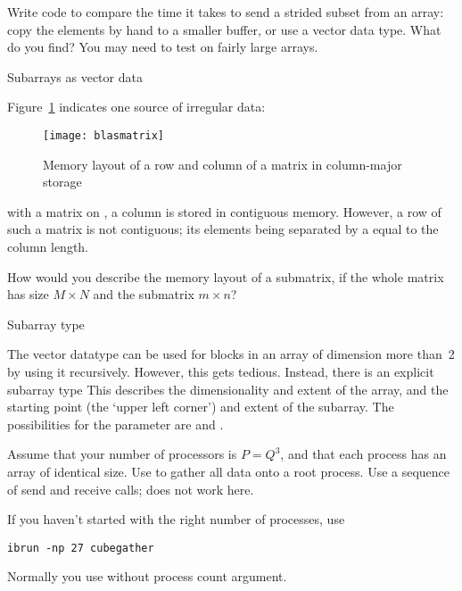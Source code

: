 \begin{exercise}
  Write code to compare the time it takes to send a strided subset
  from an array: copy the elements by hand to a smaller buffer, or use
  a vector data type. What do you find? You may need to test on fairly
  large arrays.
\end{exercise}

 {Subarrays as vector data}

Figure~\ref{fig:blasmatrix} indicates one source of irregular
data:
%
\begin{figure}[ht]
  \texttt{[image: blasmatrix]}
  \caption{Memory layout of a row and column of a matrix in column-major storage}
  \label{fig:blasmatrix}
\end{figure}
%
with a matrix on , a column is
stored in contiguous memory. However, a row of such a matrix
is not contiguous; its elements being separated by a 
equal to the column length.

\begin{exercise}
  \label{ex:submatrix}
  How would you describe the memory layout of a submatrix,
  if the whole matrix has size $M\times N$ and the submatrix $m\times n$?
\end{exercise}

 {Subarray type}
\label{sec:type_subarray}

The vector datatype can be used for blocks in an array of dimension
more than~2 by using it recursively. However, this gets
tedious. Instead, there is an explicit subarray type
%
%
This describes the dimensionality and extent of the array, and
the starting point (the `upper left corner') and extent of the
subarray.
The possibilities for the  parameter are
 and .

\begin{exercise}
  \label{ex:cubegather}

  Assume that your number of processors is $P=Q^3$, and that each
  process has an array of identical size. Use
   to gather all data onto a root process.
  Use a sequence of send and receive calls;
   does not work here.

\begin{tacc}
If you haven't started  with the right number of processes,
use
\begin{verbatim}
ibrun -np 27 cubegather
\end{verbatim}
Normally you use  without process count argument.
\end{tacc}

\end{exercise}

